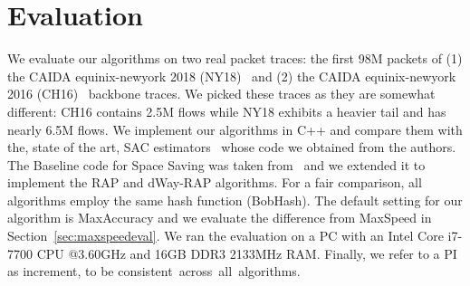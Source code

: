

%





\section{Evaluation}\label{sec:eval}
We evaluate our algorithms on two real packet traces: the first 98M packets of (1) the CAIDA equinix-newyork 2018 (NY18)~\cite{CAIDA2018} and (2) the CAIDA equinix-newyork 2016 (CH16)~\cite{CAIDA2016} backbone traces. 
We picked these traces as they are somewhat different: CH16 contains 2.5M flows while NY18 exhibits a heavier tail and has nearly 6.5M flows. 
We implement our algorithms in C++ and compare them with the, state of the art, SAC estimators~\cite{Infocom2019} whose code we obtained from the authors. The Baseline code for Space Saving was taken from~\cite{CormodeCode} and we extended it to implement the RAP and dWay-RAP algorithms. For a fair comparison, all algorithms employ the same hash function (BobHash).
The default setting for our algorithm is {\sc MaxAccuracy} and we evaluate the difference from {\sc MaxSpeed} in Section~\ref{sec:maxspeedeval}. 
We ran the evaluation on a PC with an Intel Core i7-7700 CPU @3.60GHz and 16GB DDR3 2133MHz RAM. Finally, we refer to a PI as increment, to be \mbox{consistent across all algorithms.}


